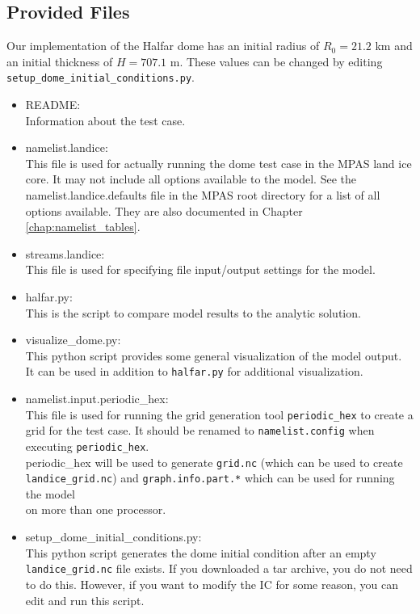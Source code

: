 \subsection{Provided Files}
\label{subsec:halfar_files}
Our implementation of the Halfar dome has an initial radius of $R_0=21.2$ km and an initial thickness of $H=707.1$ m.
These values can be changed by editing \texttt{setup\_dome\_initial\_conditions.py}.

\begin{itemize}
	\item README: \\
		Information about the test case.

	\item namelist.landice: \\
		This file is used for actually running the dome test case in the MPAS land ice core.  It may not include all options available to the model.  See the namelist.landice.defaults file in the MPAS root directory for a list of all options available.  They are also documented in Chapter \ref{chap:namelist_tables}.

	\item streams.landice: \\
		This file is used for specifying file input/output settings for the model.

	\item halfar.py: \\
		This is the script to compare model results to the analytic solution.

	\item visualize\_dome.py: \\
		This python script provides some general visualization of the model output.
		It can be used in addition to \texttt{halfar.py} for additional visualization.

	\item namelist.input.periodic\_hex: \\
		This file is used for running the grid generation tool \texttt{periodic\_hex} to create a grid for the test case.
		It should be renamed to \texttt{namelist.config} when executing \texttt{periodic\_hex}. \\
		periodic\_hex will be used to generate \texttt{grid.nc} (which can be used to create \\
		\texttt{landice\_grid.nc}) and \texttt{graph.info.part.*} which can be used for running the model \\
		on more than one processor.
	\item setup\_dome\_initial\_conditions.py: \\
		This python script generates the dome initial condition after an empty \texttt{landice\_grid.nc} file exists.  If you downloaded a tar archive, you do not need to do this.  However, if you want to modify the IC for some reason, you can edit and run this script.
\end{itemize}


